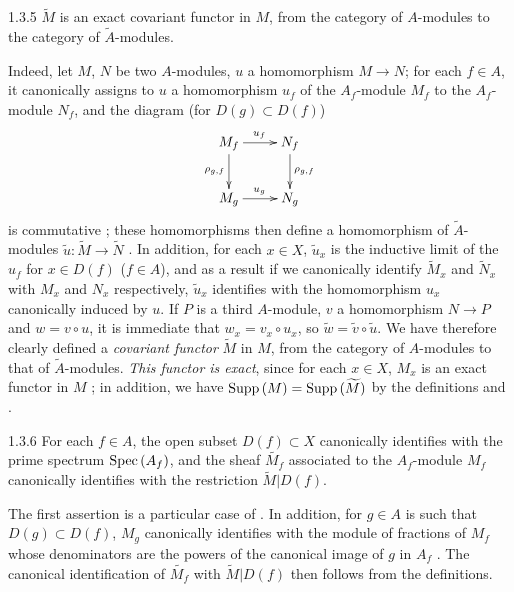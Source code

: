 \begin{envs}[Proposition]{1.3.5}
\label{prop-1.1.3.5}
$\widetilde{M}$ is an exact covariant functor in $M$, from the category of $A$-modules to the
category of $\widetilde{A}$-modules.
\end{envs}

Indeed, let $M$, $N$ be two $A$-modules, $u$ a homomorphism $M\to N$; for each $f\in A$,
it canonically assigns to $u$ a homomorphism $u_f$ of the $A_f$-module $M_f$ to the
$A_f$-module $N_f$, and the diagram (for $D(g)\subset D(f)$)
\[
  \xymatrix{
    M_f\ar[r]^{u_f}\ar[d]_{\rho_{g,f}} & N_f\ar[d]^{\rho_{g,f}}\\
    M_g\ar[r]^{u_g} & N_g
  }
\]
is commutative ; these homomorphisms then define a homomorphism of
$\widetilde{A}$-modules $\widetilde{u}:\widetilde{M}\to\widetilde{N}$ . In
addition, for each $x\in X$, $\widetilde{u}_x$ is the inductive limit of the $u_f$ for
$x\in D(f)$ ($f\in A$), and as a result  if we canonically identify
$\widetilde{M}_x$ and $\widetilde{N}_x$ with $M_x$ and $N_x$ respectively, $\widetilde{u}_x$
identifies with the homomorphism $u_x$ canonically induced by $u$. If $P$ is a third
$A$-module, $v$ a homomorphism $N\to P$ and $w=v\circ u$, it is immediate that
$w_x=v_x\circ u_x$, so $\widetilde{w}=\widetilde{v}\circ\widetilde{u}$. We have therefore
clearly defined a \emph{covariant functor} $\widetilde{M}$ in $M$, from the category of
$A$-modules to that of $\widetilde{A}$-modules. \emph{This functor is exact}, since for each
$x\in X$, $M_x$ is an exact functor in $M$ ; in addition, we have
${\mathop{\mathrm{Supp}}\nolimits}\,(M)={\mathop{\mathrm{Supp}}\nolimits}\,(\widetilde{M})$ by the definitions  and .

\begin{envs}[Proposition]{1.3.6}
\label{prop-1.1.3.6}
For each $f\in A$, the open subset $D(f)\subset X$ canonically identifies with the prime
spectrum ${\mathop{\mathrm{Spec}}\nolimits}\,(A_f)$, and the sheaf $\widetilde{M_f}$ associated to the $A_f$-module
$M_f$ canonically identifies with the restriction $\widetilde{M}|D(f)$.
\end{envs}

The first assertion is a particular case of . In addition, for $g\in A$ is
such that $D(g)\subset D(f)$, $M_g$ canonically identifies with the module of fractions of
$M_f$ whose denominators are the powers of the canonical image of $g$ in $A_f$
. The canonical identification of $\widetilde{M_f}$ with
$\widetilde{M}|D(f)$ then follows from the definitions.

